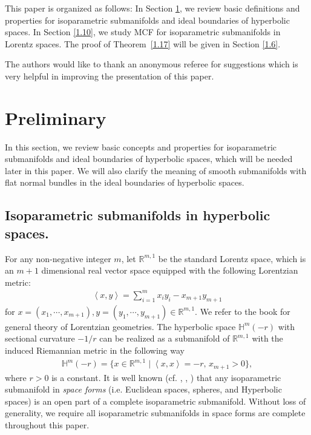 \documentclass[12pt]{article}
\begin{document}
This paper is organized as follows:
In Section \ref{1.4}, we review basic definitions and properties for isoparametric submanifolds and ideal boundaries of
hyperbolic spaces. In Section \ref{1.10}, we study  MCF for isoparametric submanifolds in Lorentz spaces. The proof of Theorem~\ref{1.17} will be given in Section \ref{1.6}.


The authors would like to thank an anonymous referee for suggestions which is very helpful in improving the presentation of this paper.


\section{Preliminary} \label{1.4}
	

In this section, we review basic concepts and properties for isoparametric submanifolds and ideal boundaries
of hyperbolic spaces, which will be needed later in this paper. We will also clarify the meaning of
smooth submanifolds with flat normal bundles in the ideal boundaries of hyperbolic spaces.


	
\subsection{Isoparametric submanifolds in hyperbolic spaces.}



For any non-negative integer $m$, let $\mathbb R^{m,1}$ be the standard Lorentz space, which is an $m+1$ dimensional real vector space equipped with the following Lorentzian metric:
      \begin{align*}
       \left<x,y\right>=\sum_{i=1}^{m} x_i y_i -x_{m+1} y_{m+1}
      \end{align*}
for $ x=(x_1, \cdots, x_{m+1}),  y=(y_1,\cdots, y_{m+1}) \in \mathbb R^{m,1}$.
We refer to the book \cite{N.S} for general theory of Lorentzian geometries.
The hyperbolic space $\mathbb{H}^{m}( -r)$ with sectional curvature $-1/r$ can be realized as a submanifold
of $\mathbb R^{m,1}$ with the induced Riemannian metric in the following way
      \begin{align*}
      	\mathbb{H}^{m}(-r)=\{x\in \mathbb R^{m,1}\mid \left<x,x\right>=-r,  \, x_{m+1}>0 \},
      \end{align*}
where $r>0$ is a constant.
It is well known (cf. \cite{T.C}, \cite{T.C.2}, \cite{B.W}) that any isoparametric submanifold in  {\it space forms}  (i.e. Euclidean spaces, spheres, and Hyperbolic spaces) is an open part of a complete isoparametric submanifold. Without loss of generality, we require all isoparametric  submanifolds in space forms are complete throughout this paper.
\end{document}
